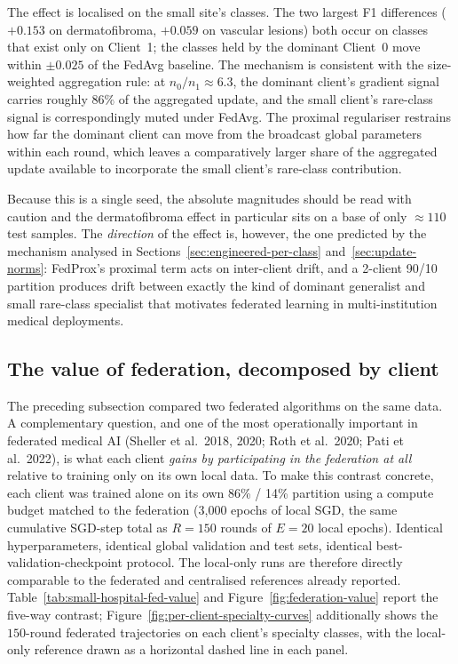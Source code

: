 \documentclass[11pt,a4paper]{report}
\begin{document}
The effect is localised on the small site's classes. The two largest
F1 differences ($+0.153$ on dermatofibroma, $+0.059$ on vascular
lesions) both occur on classes that exist only on Client~1; the
classes held by the dominant Client~0 move within $\pm 0.025$ of the
FedAvg baseline. The mechanism is consistent with the size-weighted
aggregation rule: at $n_0 / n_1 \approx 6.3$, the dominant client's
gradient signal carries roughly $86\%$ of the aggregated update, and
the small client's rare-class signal is correspondingly muted under
FedAvg. The proximal regulariser restrains how far the dominant
client can move from the broadcast global parameters within each
round, which leaves a comparatively larger share of the aggregated
update available to incorporate the small client's rare-class
contribution.

Because this is a single seed, the absolute magnitudes should be
read with caution and the dermatofibroma effect in particular sits
on a base of only $\approx 110$ test samples. The
\emph{direction} of the effect is, however, the one predicted by the
mechanism analysed in Sections~\ref{sec:engineered-per-class}
and~\ref{sec:update-norms}: FedProx's proximal term acts on
inter-client drift, and a 2-client 90/10 partition produces drift
between exactly the kind of dominant generalist and small
rare-class specialist that motivates federated learning in
multi-institution medical deployments.

\subsection{The value of federation, decomposed by client}
\label{sec:small-hospital-federation-value}

The preceding subsection compared two federated algorithms on the
same data. A complementary question, and one of the most operationally
important in federated medical AI (Sheller et al.\ 2018, 2020;
Roth et al.\ 2020; Pati et al.\ 2022), is what each client \emph{gains
by participating in the federation at all} relative to training only on
its own local data. To make this contrast concrete, each client was
trained alone on its own 86\% / 14\% partition using a compute budget
matched to the federation (3{,}000 epochs of local SGD, the same
cumulative SGD-step total as $R = 150$ rounds of $E = 20$ local epochs).
Identical hyperparameters, identical global validation and test sets,
identical best-validation-checkpoint protocol. The local-only runs are
therefore directly comparable to the federated and centralised
references already reported.
Table~\ref{tab:small-hospital-fed-value} and
Figure~\ref{fig:federation-value} report the five-way contrast;
Figure~\ref{fig:per-client-specialty-curves} additionally shows the
$150$-round federated trajectories on each client's specialty
classes, with the local-only reference drawn as a horizontal dashed
line in each panel.
\end{document}
